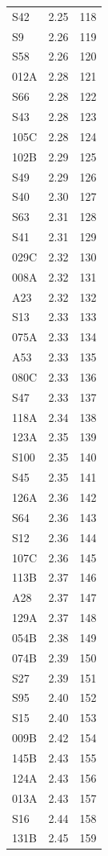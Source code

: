 \begin{longtable}{lrr}
  S42 & 2.25 & 118 \\
  S9 & 2.26 & 119 \\
  S58 & 2.26 & 120 \\
  012A & 2.28 & 121 \\
  S66 & 2.28 & 122 \\
  S43 & 2.28 & 123 \\
  105C & 2.28 & 124 \\
  102B & 2.29 & 125 \\
  S49 & 2.29 & 126 \\
  S40 & 2.30 & 127 \\
  S63 & 2.31 & 128 \\
  S41 & 2.31 & 129 \\
  029C & 2.32 & 130 \\
  008A & 2.32 & 131 \\
  A23 & 2.32 & 132 \\
  S13 & 2.33 & 133 \\
  075A & 2.33 & 134 \\
  A53 & 2.33 & 135 \\
  080C & 2.33 & 136 \\
  S47 & 2.33 & 137 \\
  118A & 2.34 & 138 \\
  123A & 2.35 & 139 \\
  S100 & 2.35 & 140 \\
  S45 & 2.35 & 141 \\
  126A & 2.36 & 142 \\
  S64 & 2.36 & 143 \\
  S12 & 2.36 & 144 \\
  107C & 2.36 & 145 \\
  113B & 2.37 & 146 \\
  A28 & 2.37 & 147 \\
  129A & 2.37 & 148 \\
  054B & 2.38 & 149 \\
  074B & 2.39 & 150 \\
  S27 & 2.39 & 151 \\
  S95 & 2.40 & 152 \\
  S15 & 2.40 & 153 \\
  009B & 2.42 & 154 \\
  145B & 2.43 & 155 \\
  124A & 2.43 & 156 \\
  013A & 2.43 & 157 \\
  S16 & 2.44 & 158 \\
  131B & 2.45 & 159 \\

\end{longtable}
